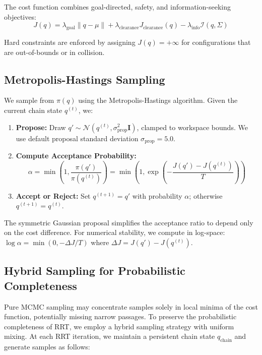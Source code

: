 The cost function combines goal-directed, safety, and information-seeking objectives:
\begin{equation}
    J(q) = \lambda_{\text{goal}} \|q - \mu\| + \lambda_{\text{clearance}} J_{\text{clearance}}(q) - \lambda_{\text{info}} \mathcal{I}(q, \Sigma)
\end{equation}

Hard constraints are enforced by assigning $J(q) = +\infty$ for configurations that are out-of-bounds or in collision.

\subsection{Metropolis-Hastings Sampling}

We sample from $\pi(q)$ using the Metropolis-Hastings algorithm. Given the current chain state $q^{(t)}$, we:
\begin{enumerate}
    \item \textbf{Propose:} Draw $q' \sim \mathcal{N}(q^{(t)}, \sigma_{\text{prop}}^2 \mathbf{I})$, clamped to workspace bounds. We use default proposal standard deviation $\sigma_{\text{prop}} = 5.0$.
    \item \textbf{Compute Acceptance Probability:}
    \begin{equation}
        \alpha = \min\left(1, \frac{\pi(q')}{\pi(q^{(t)})}\right) = \min\left(1, \exp\left(-\frac{J(q') - J(q^{(t)})}{T}\right)\right)
    \end{equation}
    \item \textbf{Accept or Reject:} Set $q^{(t+1)} = q'$ with probability $\alpha$; otherwise $q^{(t+1)} = q^{(t)}$.
\end{enumerate}

The symmetric Gaussian proposal simplifies the acceptance ratio to depend only on the cost difference. For numerical stability, we compute in log-space: $\log \alpha = \min(0, -\Delta J / T)$ where $\Delta J = J(q') - J(q^{(t)})$.

\subsection{Hybrid Sampling for Probabilistic Completeness}

Pure MCMC sampling may concentrate samples solely in local minima of the cost function, potentially missing narrow passages. To preserve the probabilistic completeness of RRT, we employ a hybrid sampling strategy with uniform mixing. At each RRT iteration, we maintain a persistent chain state $q_{\text{chain}}$ and generate samples as follows:

